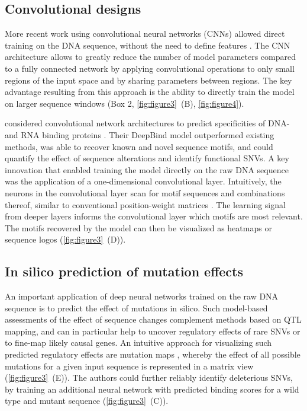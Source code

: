 \subsection{Convolutional designs}
More recent work using convolutional neural networks (CNNs) allowed direct training on the DNA sequence, without the need to define features \citep{alipanahi_predicting_2015,angermueller_accurate_2017,kelley_basset:_2016,zhou_predicting_2015}. The CNN architecture allows to greatly reduce the number of model parameters compared to a fully connected network by applying convolutional operations to only small regions of the input space and by sharing parameters between regions. The key advantage resulting from this approach is the ability to directly train the model on larger sequence windows (Box 2, \autoref{fig:figure3}~(B), \autoref{fig:figure4}).

\citeauthor{alipanahi_predicting_2015} considered convolutional network architectures to predict specificities of DNA- and RNA binding proteins \citep{alipanahi_predicting_2015}. Their DeepBind model outperformed existing methods, was able to recover known and novel sequence motifs, and could quantify the effect of sequence alterations and identify functional SNVs. A key innovation that enabled training the model directly on the raw DNA sequence was the application of a one-dimensional convolutional layer. Intuitively, the neurons in the convolutional layer scan for motif sequences and combinations thereof, similar to conventional position-weight matrices \citep{stormo_use_1982}. The learning signal from deeper layers informs the convolutional layer which motifs are most relevant. The motifs recovered by the model can then be visualized as heatmaps or sequence logos (\autoref{fig:figure3}~(D)).

\subsection{In silico prediction of mutation effects}
An important application of deep neural networks trained on the raw DNA sequence is to predict the effect of mutations in silico. Such model-based assessments of the effect of sequence changes complement methods based on QTL mapping, and can in particular help to uncover regulatory effects of rare SNVs or to fine-map likely causal genes. An intuitive approach for visualizing such predicted regulatory effects are mutation maps \citep{alipanahi_predicting_2015}, whereby the effect of all possible mutations for a given input sequence is represented in a matrix view (\autoref{fig:figure3}~(E)). The authors could further reliably identify deleterious SNVs, by training an additional neural network with predicted binding scores for a wild type and mutant sequence (\autoref{fig:figure3}~(C)).


